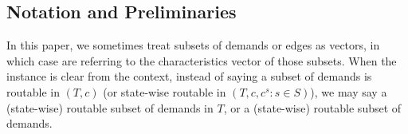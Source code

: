 \subsection{Notation and Preliminaries}


In this paper, we sometimes treat subsets of demands or edges as vectors, in which case are referring to the characteristics vector of those subsets. When the instance is clear from the context, instead of saying a subset of demands is routable in $(T,c)$ (or state-wise routable in $(T,c,c^s:s\in S)$), we may say a (state-wise) routable subset of demands in $T$, or a (state-wise) routable subset of demands.

